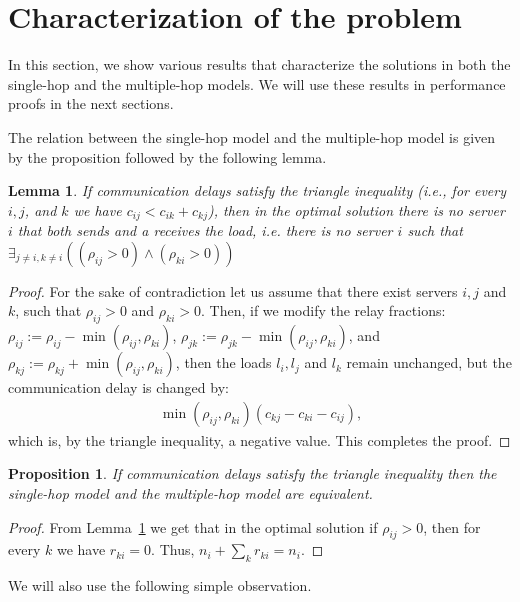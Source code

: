 \documentclass[11pt]{article}
\newtheorem{proposition}[theorem]{Proposition}
\newtheorem{lemma}[theorem]{Lemma}
\begin{document}
\section{Characterization of the problem}
In this section, we show various results that characterize the solutions in both the single-hop and the multiple-hop models. We will use these results in performance proofs in the next sections.

The relation between the single-hop model and the multiple-hop model is given by the proposition followed by the following lemma.

\begin{lemma}\label{lemma:recevAndSend}
If communication delays satisfy the triangle inequality (i.e., for every $i, j$, and $k$ we have $c_{ij} < c_{ik} + c_{kj}$), then in the optimal solution there is no server $i$ that both sends and a receives the load, i.e. there is no server $i$ such that $\exists_{j \neq i,k \neq i}\left( (\rho_{ij} > 0) \wedge (\rho_{ki} > 0) \right)$
\end{lemma}
\begin{proof}
For the sake of contradiction let us assume that there exist servers $i, j$ and $k$, such that $\rho_{ij} > 0$ and $\rho_{ki} > 0$. Then, if we modify the relay fractions: $\rho_{ij} := \rho_{ij} - \min(\rho_{ij}, \rho_{ki})$, $\rho_{jk} := \rho_{jk} - \min(\rho_{ij}, \rho_{ki})$, and $\rho_{kj} := \rho_{kj} + \min(\rho_{ij}, \rho_{ki})$, then the loads $l_i, l_j$ and $l_k$ remain unchanged, but the communication delay is changed by:
\begin{align*}
\min(\rho_{ij}, \rho_{ki})(c_{kj} - c_{ki} - c_{ij}) \textrm{,}
\end{align*}
which is, by the triangle inequality, a negative value. This completes the proof.
\end{proof}

\begin{proposition}\label{prop:multiSingleHopEquiv}
If communication delays satisfy the triangle inequality then the single-hop model and the multiple-hop model are equivalent.
\end{proposition}
\begin{proof}
From Lemma~\ref{lemma:recevAndSend} we get that in the optimal solution if $\rho_{ij} > 0$, then for every $k$ we have $r_{ki} = 0$. Thus, $n_i + \sum_{k}r_{ki} = n_i$.
\end{proof}

We will also use the following simple observation.
\end{document}
